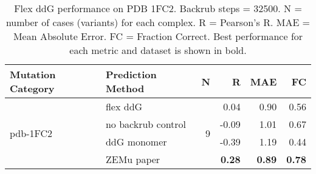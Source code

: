 \begin{table}
  \begin{tabular}{llrrrr}
\toprule
Mutation Category &   Prediction Method &  N &     R &  MAE &   FC \\
\midrule
 \multirow{ 4}{*}{pdb-1FC2} & flex ddG & \multirow{ 4}{*}{9} & 0.04 & 0.90 & 0.56  \\
 & no backrub control & & -0.09 & 1.01 & 0.67  \\
 & ddG monomer & & -0.39 & 1.19 & 0.44  \\
 & ZEMu paper & & \textbf{0.28} & \textbf{0.89} & \textbf{0.78}  \\
\bottomrule
\end{tabular}
  \caption[Flex ddG performance on PDB 1FC2]{
    Flex ddG performance on PDB 1FC2. Backrub steps = 32500. N = number of cases (variants) for each complex. R = Pearson's R. MAE = Mean Absolute Error. FC = Fraction Correct. Best performance for each metric and dataset is shown in bold.
  } \label{tab:table-pdb-1FC2}
\end{table}
